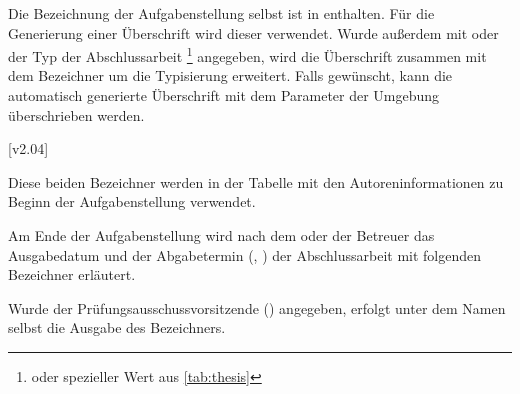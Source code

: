 \begin{DeclareEntity}{}
\begin{Declaration}
  {}
\begin{Declaration}
  {}
\printdeclarationlist

Die Bezeichnung der Aufgabenstellung selbst ist in  enthalten. 
Für die Generierung einer Überschrift wird dieser verwendet. Wurde außerdem mit 
 oder  der Typ der Abschlussarbeit%
\footnote{%
   oder spezieller Wert aus \autoref{tab:thesis}%
}
angegeben, wird die Überschrift zusammen mit dem Bezeichner 
um die Typisierung erweitert. Falls gewünscht, kann die automatisch generierte 
Überschrift mit dem Parameter  der Umgebung 
 überschrieben werden.
\end{Declaration}
\end{Declaration}

\begin{Declaration}
  {}
  [v2.04]
\begin{Declaration}
  {}
\printdeclarationlist

Diese beiden Bezeichner werden in der Tabelle mit den Autoreninformationen zu 
Beginn der Aufgabenstellung verwendet.
\end{Declaration}
\end{Declaration}

\begin{Declaration}
  {}
\begin{Declaration}
  {}
\printdeclarationlist

Am Ende der Aufgabenstellung wird nach dem oder der Betreuer das Ausgabedatum 
und der Abgabetermin (, ) der Abschlussarbeit 
mit folgenden Bezeichner erläutert.
\end{Declaration}
\end{Declaration}

\begin{Declaration}
  {}
\printdeclarationlist

Wurde der Prüfungsausschussvorsitzende () angegeben, erfolgt 
unter dem Namen selbst die Ausgabe des Bezeichners.
\end{Declaration}

\begin{Declaration}
  {}
\begin{Declaration}
  {}
\printdeclarationlist


\end{Declaration}
\end{Declaration}
\end{DeclareEntity}
